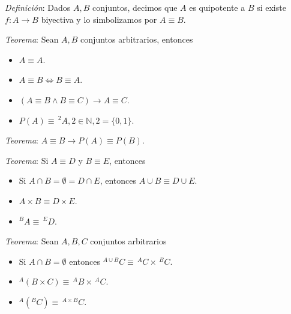\documentclass{beamer}
\begin{document}
  
  \begin{frame}
    \textit{Definición}: Dados $A, B$ conjuntos, decimos que 
    $A$ es quipotente a $B$ si existe $f: A \to B$ biyectiva y lo
    simbolizamos por $A \equiv B$.
    \newline\newline
    \pause 

    \textit{Teorema}: Sean $A, B$ conjuntos arbitrarios, entonces
    \begin{itemize}[<+->]
      \item $A \equiv A$.
      \item $A \equiv B \iff B \equiv A$.
      \item $(A \equiv B \land B \equiv C) \rightarrow A \equiv C$.
      \item $P(A) \equiv\, ^2 A, 2 \in \mathbb{N}, 2 = \{0, 1\}$.
    \end{itemize}
  \end{frame}

  \begin{frame}
    \textit{Teorema}: $A \equiv B \rightarrow P(A) \equiv P(B)$.
    \newline\newline
    \pause

    \textit{Teorema}: Si $A \equiv D$ y $B \equiv E$, entonces 
    \begin{itemize}[<+->]
      \item Si $A \cap B = \emptyset = D \cap E$, entonces $A \cup B \equiv D \cup E$.
      \item $A \times B \equiv D \times E$.
      \item $^B A \equiv\, ^E D$.
    \end{itemize}
  \end{frame}

  \begin{frame}
    \textit{Teorema}: Sean $A, B, C$ conjuntos arbitrarios 

    \begin{itemize}[<+->]
      \item Si $A \cap B = \emptyset$ entonces $^{A \cup B} C \equiv\, ^A C \times\, ^B C$.
      \item $^A (B \times C) \equiv\, ^A B \times\, ^A C$.
      \item $^A (^B C) \equiv\, ^{A \times B} C$.
    \end{itemize}
  \end{frame}
\end{document}
